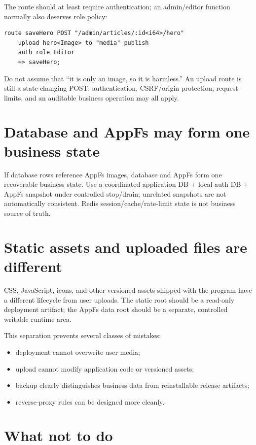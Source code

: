 The route should at least require authentication; an admin/editor function normally also deserves role policy:

\begin{lstlisting}[language=Velran]
route saveHero POST "/admin/articles/:id<i64>/hero"
    upload hero<Image> to "media" publish
    auth role Editor
    => saveHero;
\end{lstlisting}

Do not assume that ``it is only an image, so it is harmless.'' An upload route is still a state-changing POST: authentication, CSRF/origin protection, request limits, and an auditable business operation may all apply.

\section{Database and AppFs may form one business state}

If database rows reference AppFs images, database and AppFs form one recoverable business state. Use a coordinated application DB + local-auth DB + AppFs snapshot under controlled stop/drain; unrelated snapshots are not automatically consistent. Redis session/cache/rate-limit state is not business source of truth.

\section{Static assets and uploaded files are different}

CSS, JavaScript, icons, and other versioned assets shipped with the program have a different lifecycle from user uploads. The static root should be a read-only deployment artifact; the AppFs data root should be a separate, controlled writable runtime area.

This separation prevents several classes of mistakes:

\begin{itemize}
  \item deployment cannot overwrite user media;
  \item upload cannot modify application code or versioned assets;
  \item backup clearly distinguishes business data from reinstallable release artifacts;
  \item reverse-proxy rules can be designed more cleanly.
\end{itemize}

\section{What not to do}

